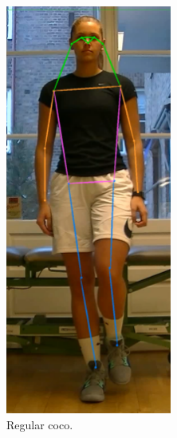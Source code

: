 \begin{figure}
 \centering
 \begin{subfigure}[t]{0.4\textwidth}
   \centering
  \includegraphics[width=0.6\textwidth]{files/figs/coco.png}
  \caption{Regular \gls{coco}.}
  \label{fig:coco}
 \end{subfigure}
 ~
 \begin{subfigure}[t]{0.4\textwidth}
   \centering

\end{subfigure}
\end{figure}
